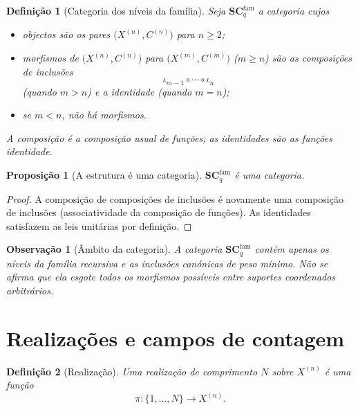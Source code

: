 \documentclass[11pt,a4paper]{article}
\newtheorem{definicao}{Definição}
\newtheorem{proposicao}{Proposição}
\newtheorem{observacao}{Observação}
\begin{document}
\begin{definicao}[Categoria dos níveis da família]
\label{def:categoria-niveis}
Seja \(\mathbf{SC}_q^{\mathrm{fam}}\) a categoria cujos
\begin{itemize}[leftmargin=1.5em]
\item objectos são os pares \(\bigl(X^{(n)},C^{(n)}\bigr)\) para \(n\ge 2\);
\item morfismos de \(\bigl(X^{(n)},C^{(n)}\bigr)\) para
\(\bigl(X^{(m)},C^{(m)}\bigr)\) (\(m\ge n\)) são as composições de
inclusões
\[
\iota_{m-1}\circ\cdots\circ\iota_n
\]
(quando \(m>n\)) e a identidade (quando \(m=n\));
\item se \(m<n\), não há morfismos.
\end{itemize}
A composição é a composição usual de funções; as identidades são as
funções identidade.
\end{definicao}

\begin{proposicao}[A estrutura é uma categoria]
\label{prop:categoria}
\(\mathbf{SC}_q^{\mathrm{fam}}\) é uma categoria.
\end{proposicao}

\begin{proof}
A composição de composições de inclusões é novamente uma composição de
inclusões (associatividade da composição de funções).
As identidades satisfazem as leis unitárias por definição.
\end{proof}

\begin{observacao}[Âmbito da categoria]
\label{obs:ambito-categoria}
A categoria \(\mathbf{SC}_q^{\mathrm{fam}}\) contém apenas os níveis da
família recursiva e as inclusões canónicas de peso mínimo.
Não se afirma que ela esgote todos os morfismos possíveis entre suportes
coordenados arbitrários.
\end{observacao}

\section{Realizações e campos de contagem}
\label{sec:realizacoes}

\begin{definicao}[Realização]
\label{def:realizacao}
Uma \emph{realização} de comprimento \(N\) sobre \(X^{(n)}\) é uma função
\[
\pi\colon\{1,\dots,N\}\to X^{(n)}.
\]
\end{definicao}
\end{document}
